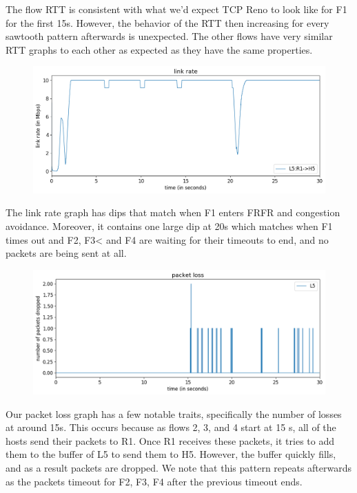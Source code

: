 \documentclass{article}
\begin{document}
The flow RTT is consistent with what we'd expect TCP Reno to look like for F1 for the first 15s. However, the behavior of the RTT then increasing for every sawtooth pattern afterwards is unexpected. The other flows have very similar RTT graphs to each other as expected as they have the same properties.

\begin{figure}[H]
\centering
\includegraphics[width = \textwidth]{"test_case5_reno link rate"}
\end{figure}


The link rate graph has dips that match when F1 enters FRFR and congestion avoidance. Moreover, it contains one large dip at 20s which matches when F1 times out and F2, F3< and F4 are waiting for their timeouts to end, and no packets are being sent at all.

\begin{figure}[H]
\centering
\includegraphics[width = \textwidth]{"test_case5_reno packet loss"}
\end{figure}


Our packet loss graph has a few notable traits, specifically the number of losses at around 15s. This occurs because as flows 2, 3, and 4 start at 15 s, all of the hosts send their packets to R1. Once R1 receives these packets, it tries to add them to the buffer of L5 to send them to H5. However, the buffer quickly fills, and as a result packets are dropped. We note that this pattern repeats afterwards as the packets timeout for F2, F3, F4 after the previous timeout ends.
\end{document}
